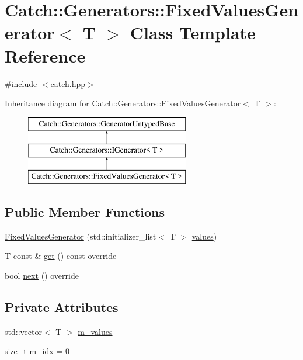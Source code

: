 \hypertarget{class_catch_1_1_generators_1_1_fixed_values_generator}{}\section{Catch\+::Generators\+::Fixed\+Values\+Generator$<$ T $>$ Class Template Reference}
\label{class_catch_1_1_generators_1_1_fixed_values_generator}


{\ttfamily \#include $<$catch.\+hpp$>$}

Inheritance diagram for Catch\+::Generators\+::Fixed\+Values\+Generator$<$ T $>$\+:\begin{figure}[H]
\begin{center}
\leavevmode
\includegraphics[height=3.000000cm]{class_catch_1_1_generators_1_1_fixed_values_generator}
\end{center}
\end{figure}
\subsection*{Public Member Functions}
\begin{DoxyCompactItemize}
\item 
\mbox{\hyperlink{class_catch_1_1_generators_1_1_fixed_values_generator_a6e9f473655413c1cb15f079890f06b86}{Fixed\+Values\+Generator}} (std\+::initializer\+\_\+list$<$ T $>$ \mbox{\hyperlink{namespace_catch_1_1_generators_a55ca9a1132e662d9603c516161dcae35}{values}})
\item 
T const  \& \mbox{\hyperlink{class_catch_1_1_generators_1_1_fixed_values_generator_ad2ea8c959c600386bcc4b2656b40d33e}{get}} () const override
\item 
bool \mbox{\hyperlink{class_catch_1_1_generators_1_1_fixed_values_generator_a6ce9e3ed045239c7b82873f24bd9cd3b}{next}} () override
\end{DoxyCompactItemize}
\subsection*{Private Attributes}
\begin{DoxyCompactItemize}
\item 
std\+::vector$<$ T $>$ \mbox{\hyperlink{class_catch_1_1_generators_1_1_fixed_values_generator_a591837f944b435858bc3b9fa73502ee6}{m\+\_\+values}}
\item 
size\+\_\+t \mbox{\hyperlink{class_catch_1_1_generators_1_1_fixed_values_generator_a14c3c77deb624c09065e5ccaf8646f33}{m\+\_\+idx}} = 0
\end{DoxyCompactItemize}

